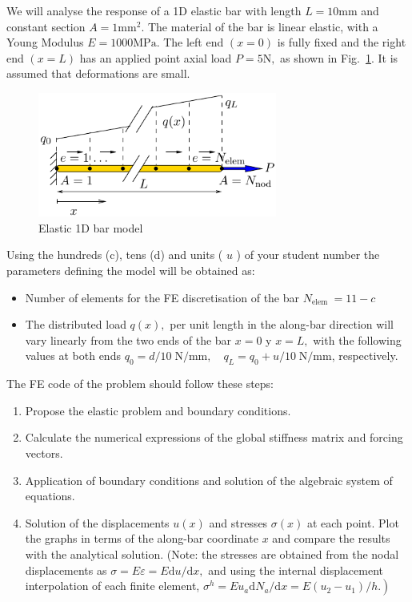 \documentclass[spanish,a4paper,12pt]{article}
\begin{document}
We will analyse the response of a 1D elastic bar with length \(L=10 \mathrm{mm}\) and constant section \(A=1 \mathrm{mm}^{2} .\) The material of the bar is linear elastic, with a Young Modulus \(E=1000 \mathrm{MPa}\).
The left end \((x=0)\) is fully fixed and the right end \((x=L)\) has an applied point axial load \(P=5 \mathrm{N},\) as shown in Fig.~\ref{fig:esq}. It is assumed that deformations are small.

\begin{figure}[!htp]
\centering
\includegraphics[width=0.7\textwidth]{figuras/esquema.pdf}
\caption{Elastic 1D bar model}
\label{fig:esq}
\end{figure}

Using the hundreds (c), tens (d) and units ( \(u\) ) of your student number the parameters defining the model will be obtained as:

\begin{itemize}
\item Number of elements for the FE discretisation of the bar \(N_{\text {elem }}=11-c\)
\item The distributed load \(q(x),\) per unit length in the along-bar direction will vary linearly from the two ends of the bar \(x=0\) y \(x=L,\) with the following values at both ends \(q_0=d / 10\; \mathrm{N} / \mathrm{mm}, \quad q_{L}=q_{0}+u / 10 \; \mathrm{N} / \mathrm{mm} \), respectively.
\end{itemize}

The FE code of the problem should follow these steps:

\begin{enumerate}
\item Propose the elastic problem and boundary conditions.
\item Calculate the numerical expressions of the global stiffness matrix and forcing vectors.
\item Application of boundary conditions and solution of the algebraic system of equations.
\item Solution of the displacements \(u(x)\) and stresses \(\sigma(x)\) at each point. Plot the graphs in terms of the along-bar coordinate \(x\) and compare the results with the analytical solution. (Note: the stresses are obtained from the nodal displacements as \(\sigma=E \varepsilon=E \mathrm{d} u / \mathrm{d} x,\) and using the internal displacement interpolation of each finite element, \(\left.\sigma^{h}=E u_{a} \mathrm{d} N_{a} / \mathrm{d} x=E\left(u_{2}-u_{1}\right) / h .\right)\)
\end{enumerate}
\end{document}
